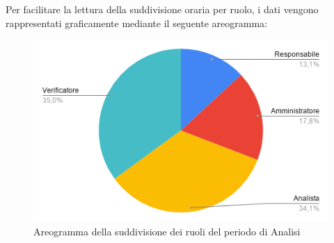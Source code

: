 \documentclass[../piano-di-progetto.tex]{subfiles}
\begin{document}
  Per facilitare la lettura della suddivisione oraria per ruolo, i dati vengono rappresentati graficamente mediante il seguente areogramma:
  \begin{figure}[H]
    \centering
    \includegraphics[width=12cm]{img/ruoli-analisi.png}
    \caption{Areogramma della suddivisione dei ruoli del periodo di Analisi}
    \label{fig:ore-ruolo-analisi}
  \end{figure}
\end{document}
